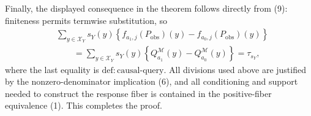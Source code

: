 Finally, the displayed consequence in the theorem follows directly from (9): finiteness permits termwise substitution, so
\[
\begin{aligned}
&\sum_{y\in\mathcal X_Y}s_Y(y)
\left\{f_{a_1,j}(P_{\mathrm{obs}})(y)-f_{a_0,j}(P_{\mathrm{obs}})(y)\right\}\\
&\qquad=
\sum_{y\in\mathcal X_Y}s_Y(y)
\left\{Q_{a_1}^{\mathcal M}(y)-Q_{a_0}^{\mathcal M}(y)\right\}
=\tau_{s_Y},
\end{aligned}
\tag{14}
\]
where the last equality is \(\mathrm{def{:}causal\text{-}query}\).  All divisions used above are justified by the nonzero-denominator implication (6), and all conditioning and support needed to construct the response fiber is contained in the positive-fiber equivalence (1).  This completes the proof.